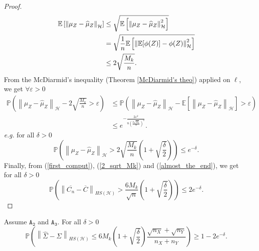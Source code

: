 \documentclass[twoside,11pt]{article}
\newcommand{\Hk}{\mathcal{H}}
\newcommand{\HSk}{HS(\mathcal{H})}
\newcommand{\PP}{\mathbb{P}}%
\newcommand{\PPO}{\mathbb{P} }
\newcommand{\EE}{\mathbb{E}}%
\newcommand{\SW}{\Sigma}
\newcommand{\hS}{\widehat{\Sigma}}
\newcommand{\A}[1]{$\mathtt{A_#1}$}
\newcommand{\ti}[1]{\textit{#1}} %
\begin{document}
\begin{proof}
\begin{align*}
    \EE\left[ \left \| \mu_Z -  \widehat{\mu}_Z \right \|_{\Hk} \right] & \leq \sqrt{ \EE\left[ \left \| \mu_Z -  \widehat{\mu}_Z \right \|_{\Hk}^2 \right] } \notag \\
    & = \sqrt{\frac{1}{n} \EE\left[ \left \| \EE[\phi(Z)] - \phi(Z) \right\|_{\Hk}^2\right]} \notag \\
    & \leq 2 \sqrt{\frac{M_k}{n}}.
\end{align*}
From the McDiarmid’s inequality (Theorem \ref{McDiarmid's theo}) applied on $\ell$, we get $\forall \varepsilon >0$ 
\begin{align*}
    \PP \left( \left \|  \mu_Z - \widehat{\mu}_Z \right \|_{\Hk} -  2\sqrt{\frac{M_k}{n}} > \varepsilon  \right) &\leq \PP \left( \left \|  \mu_Z - \widehat{\mu}_Z  \right \|_{\Hk} - \EE\left[ \left \| \mu_Z -  \widehat{\mu}_Z \right \|_{\Hk} \right] > \varepsilon  \right) \\
     & \leq e^{-\frac{2 \varepsilon^2}{n \left(\frac{2 \sqrt{M_k}}{n}\right)^2}}.
\end{align*}
\ti{e.g.} for all $\delta >0$ 
\begin{equation}
      \PP \left( \left \| \mu_Z - \widehat{\mu}_Z \right \|_{\Hk} > 2\sqrt{\frac{M_k}{n}} \left( 1 + \sqrt{\frac{\delta}{2}}\right)  \right) \leq e^{-\delta}. 
      \label{almost_the_end}
\end{equation}
Finally, from (\ref{first_comput}), (\ref{2_sqrt_Mk}) and (\ref{almost_the_end}), we get for all $\delta>0$
\begin{equation*}
    \PPO \left( \left \| \overline{C_n} - \overline{C} \right \|_{\HSk} > \frac{6 M_k}{\sqrt{n}} \left(1+ \sqrt{\frac{\delta}{2}}\right) \right) \leq 2 e^{-\delta}.
\end{equation*}
\end{proof}
\begin{corollary}
Assume \A{2} and \A{3}. For all $\delta>0$ 
\begin{equation*}
     \PPO \left( \left \| \hS - \SW \right \|_{\HSk} \leq 6 M_k \left( 1 + \sqrt{\frac{\delta}{2}}\right) \frac{\sqrt{n_X} + \sqrt{n_Y}}{n_X + n_Y} \right) \geq 1 - 2e^{-\delta}.
\end{equation*}
\label{Blanchard_for_SigmaW}
\end{corollary}
\end{document}
